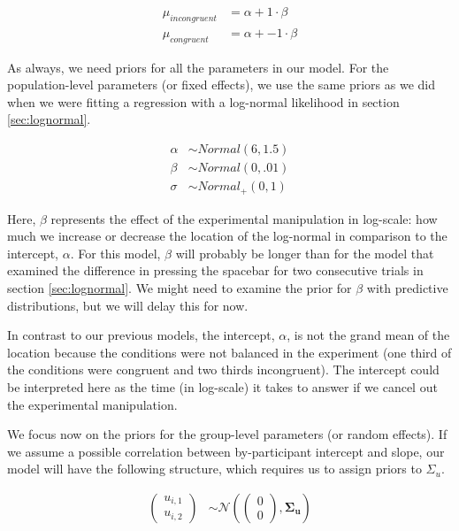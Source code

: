 \documentclass[12pt,]{krantz}
\theoremstyle{definition}
\theoremstyle{definition}
\theoremstyle{definition}
\theoremstyle{remark}
\begin{document}
\begin{equation}
\begin{aligned}
  \mu_{incongruent} &= \alpha + 1 \cdot  \beta \\
  \mu_{congruent} &= \alpha + -1 \cdot  \beta
  \end{aligned}
\end{equation}

As always, we need priors for all the parameters in our model. For the
population-level parameters (or fixed effects), we use the same priors
as we did when we were fitting a regression with a log-normal likelihood
in section \ref{sec:lognormal}.

\begin{equation}
 \begin{aligned}
   \alpha & \sim Normal(6, 1.5) \\
   \beta  & \sim Normal(0, .01) \\
    \sigma  &\sim Normal_+(0, 1)
 \end{aligned}
 \end{equation}

Here, \(\beta\) represents the effect of the experimental manipulation
in log-scale: how much we increase or decrease the location of the
log-normal in comparison to the intercept, \(\alpha\). For this model,
\(\beta\) will probably be longer than for the model that examined the
difference in pressing the spacebar for two consecutive trials in
section \ref{sec:lognormal}. We might need to examine the prior for
\(\beta\) with predictive distributions, but we will delay this for now.

In contrast to our previous models, the intercept, \(\alpha\), is not
the grand mean of the location because the conditions were not balanced
in the experiment (one third of the conditions were congruent and two
thirds incongruent). The intercept could be interpreted here as the time
(in log-scale) it takes to answer if we cancel out the experimental
manipulation.

We focus now on the priors for the group-level parameters (or random
effects). If we assume a possible correlation between by-participant
intercept and slope, our model will have the following structure, which
requires us to assign priors to \(\Sigma_u\).

\begin{equation}
 \begin{aligned}
    {\begin{pmatrix}
    u_{i,1} \\
    u_{i,2}
    \end{pmatrix}}
   &\sim {\mathcal {N}}
    \left(
   {\begin{pmatrix} 
    0\\
    0
   \end{pmatrix}}
 ,\boldsymbol{\Sigma_u} \right) 
 \end{aligned}
 \end{equation}
\end{document}

